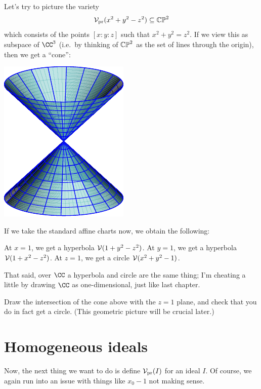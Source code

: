\begin{example}
	Let's try to picture the variety
	\[ \mathcal V_{\text{pr}}(x^2+y^2-z^2) \subseteq \mathbb{CP}^2 \]
	which consists of the points $[x:y:z]$ such that $x^2+y^2=z^2$.
	If we view this as subspace of $\CC^3$
	(i.e.\ by thinking of $\mathbb{CP}^2$ as the set of lines through the origin),
	then we get a ``cone'':
	\begin{center}
		\includegraphics{media/cone.pdf}
	\end{center}

	If we take the standard affine charts now, we obtain the following:
	\begin{itemize}
		\ii At $x=1$, we get a hyperbola $\mathcal V(1+y^2-z^2)$.
		\ii At $y=1$, we get a hyperbola $\mathcal V(1+x^2-z^2)$.
		\ii At $z=1$, we get a circle $\mathcal V(x^2+y^2-1)$.
	\end{itemize}
	That said, over $\CC$ a hyperbola and circle
	are the same thing; I'm cheating a little by drawing $\CC$
	as one-dimensional, just like last chapter.
\end{example}
\begin{ques}
	Draw the intersection of the cone above
	with the $z=1$ plane, and check that you do in fact get a circle.
	(This geometric picture will be crucial later.)
\end{ques}

\section{Homogeneous ideals}
Now, the next thing we want to do is define $\mathcal V_{\text{pr}}(I)$ for an ideal $I$.
Of course, we again run into an issue with things like $x_0-1$ not
making sense. 

